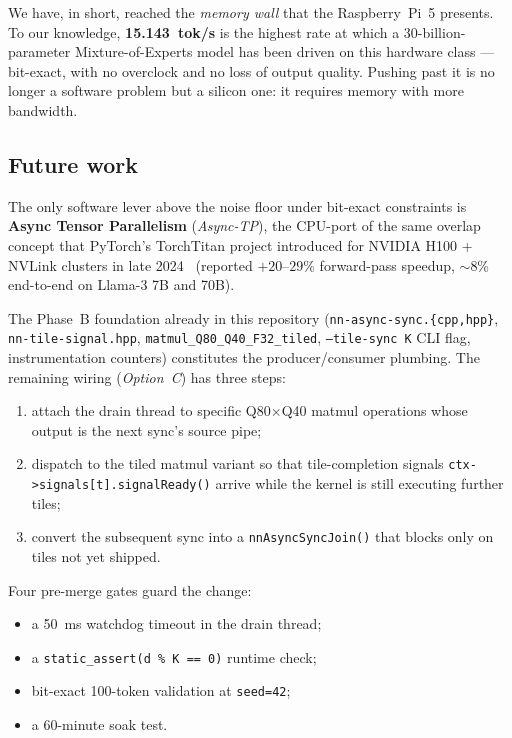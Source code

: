 \documentclass[10pt,a4paper]{article}
\begin{document}
We have, in short, reached the \emph{memory wall} that the Raspberry~Pi~5 presents. To our knowledge, \textbf{15.143~tok/s} is the highest rate at which a 30-billion-parameter Mixture-of-Experts model has been driven on this hardware class --- bit-exact, with no overclock and no loss of output quality. Pushing past it is no longer a software problem but a silicon one: it requires memory with more bandwidth.

\subsection{Future work}

The only software lever above the noise floor under bit-exact constraints is \textbf{Async Tensor Parallelism} (\emph{Async-TP}), the CPU-port of the same overlap concept that PyTorch's TorchTitan project introduced for NVIDIA H100 + NVLink clusters in late 2024~\cite{torchtitan2024} (reported $+20$--$29\%$ forward-pass speedup, $\sim$8\% end-to-end on Llama-3 7B and 70B).

The Phase~B foundation already in this repository (\texttt{nn-async-sync.\{cpp,hpp\}}, \texttt{nn-tile-signal.hpp}, \texttt{matmul\_Q80\_Q40\_F32\_tiled}, \texttt{--tile-sync K} CLI flag, instrumentation counters) constitutes the producer/consumer plumbing. The remaining wiring (\emph{Option~C}) has three steps:

\begin{enumerate}
  \item attach the drain thread to specific Q80$\times$Q40 matmul operations whose output is the next sync's source pipe;
  \item dispatch to the tiled matmul variant so that tile-completion signals \texttt{ctx->signals[t].signalReady()} arrive while the kernel is still executing further tiles;
  \item convert the subsequent sync into a \texttt{nnAsyncSyncJoin()} that blocks only on tiles not yet shipped.
\end{enumerate}

\noindent Four pre-merge gates guard the change:

\begin{itemize}
  \item a 50~ms watchdog timeout in the drain thread;
  \item a \texttt{static\_assert(d~\%~K~==~0)} runtime check;
  \item bit-exact 100-token validation at \texttt{seed=42};
  \item a 60-minute soak test.
\end{itemize}
\end{document}
